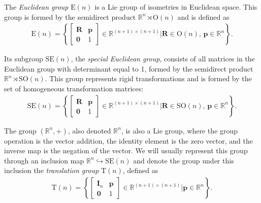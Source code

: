\begin{example}\label{ex:euclidean-group-special-euclidean-group}
    The \emph{Euclidean group} $\text{E}(n)$ is a Lie group of isometries in Euclidean space. This group is formed by the semidirect product $\mathbb{R}^n \rtimes \text{O}(n)$ and is defined as
    \begin{align}
        \text{E}(n) = \left\{\begin{bmatrix}
            \mathbf{R} & \mathbf{p} \\ \mathbf{0} & 1
        \end{bmatrix} \in \mathbb{R}^{(n+1)\times(n+1)} | \mathbf{R}\in\text{O}(n),\, \mathbf{p}\in\mathbb{R}^n\right\}.
    \end{align}

    Its subgroup $\text{SE}(n)$, the \emph{special Euclidean group}, consists of all matrices in the Euclidean group with determinant equal to 1, formed by the semidirect product $\mathbb{R}^n\rtimes \text{SO}(n)$. This group represents rigid transformations and is formed by the set of homogeneous transformation matrices:
    \begin{align}
        \text{SE}(n) = \left\{\begin{bmatrix}
            \mathbf{R} & \mathbf{p} \\ \mathbf{0} & 1
        \end{bmatrix} \in \mathbb{R}^{(n+1)\times(n+1)} | \mathbf{R}\in\text{SO}(n),\, \mathbf{p}\in\mathbb{R}^n\right\}.
    \end{align}
\end{example}
\begin{example}\label{ex:translation-group}
    The group $(\mathbb{R}^n,+)$, also denoted $\mathbb{R}^n$, is also a Lie group, where the group operation is the vector addition, the identity element is the zero vector, and the inverse map is the negation of the vector. We will usually represent this group through an inclusion map $\mathbb{R}^n \hookrightarrow \text{SE}(n)$ and denote the group under this inclusion the \emph{translation group} $\text{T}(n)$, defined as
    \begin{align}
        \text{T}(n) = \left\{\begin{bmatrix}
            \mathbf{I}_n & \mathbf{p} \\ \mathbf{0} & 1
        \end{bmatrix} \in \mathbb{R}^{(n+1)\times(n+1)} | \mathbf{p}\in\mathbb{R}^n\right\}.
    \end{align}
\end{example}
